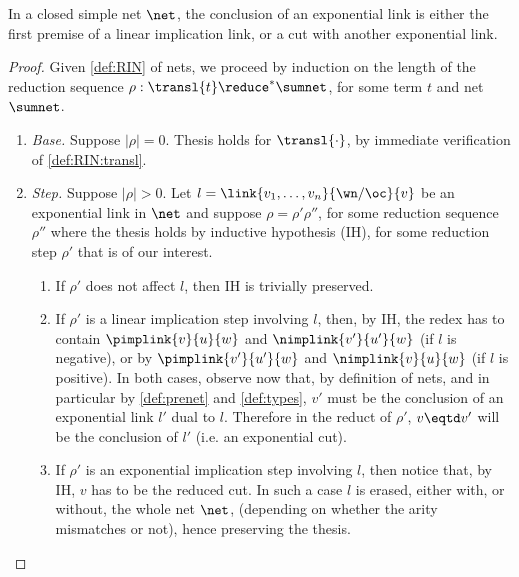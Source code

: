 \begin{lemma}
\label{lem:RIN:exponentials}
In a closed simple net $\net$,
the conclusion of an exponential link is either
the first premise of a linear implication link, or
a cut with another exponential link.
\end{lemma}
\begin{proof}
Given \autoref{def:RIN} of nets, we proceed by induction on the length of 
the reduction sequence $\rho: \transl{t} \reduce^* \sumnet$, 
for some term $t$ and net $\sumnet$.
\begin{enumerate}
\item \textit{Base.} Suppose $|\rho| = 0$.
  Thesis holds for $\transl{\cdot}$, by immediate verification of 
  \autoref{def:RIN:transl}.
\item \textit{Step.} Suppose $|\rho| > 0$.
  Let $l = \link{v_1, \ldots, v_n}{\wn/\oc}{v}$
    be an exponential link in $\net$ 
  and suppose $\rho = \rho' \rho''$,
    for some reduction sequence $\rho''$
      where the thesis holds by inductive hypothesis (IH),
        for some reduction step $\rho'$ that is of our interest.
  \begin{enumerate}
  \item If $\rho'$ does not affect $l$, then IH is trivially preserved.
  \item If $\rho'$ is a linear implication step involving $l$, then, by IH, the
    redex has to contain $\pimplink{v}{u}{w}$ and $\nimplink{v'}{u'}{w}$
    (if $l$ is negative), or 
    by $\pimplink{v'}{u'}{w}$ and $\nimplink{v}{u}{w}$
    (if $l$ is positive).
    In both cases, observe now that, by definition of nets, and in particular 
    by \autoref{def:prenet} and \ref{def:types},
    $v'$ must be the conclusion of an exponential link $l'$ dual to $l$.
    Therefore in the reduct of $\rho'$, $v\eqtd v'$ will be the conclusion 
    of $l'$ (i.e. an exponential cut).
  \item If $\rho'$ is an exponential implication step involving $l$, then 
    notice that, by IH, $v$ has to be the reduced cut.
    In such a case $l$ is erased,
    either with, or without, the whole net $\net$, 
    (depending on whether the arity mismatches or not),
    hence preserving the thesis.
  \end{enumerate}
\end{enumerate}
\vspace{-1.5em}
\end{proof}




